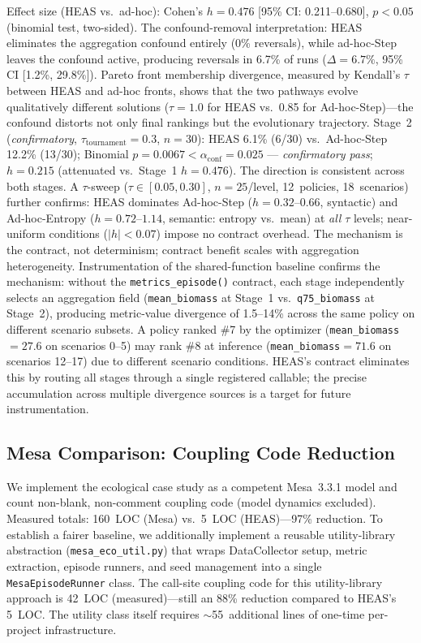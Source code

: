 \documentclass{wscpaperproc}
\begin{document}
Effect size (HEAS vs.\ ad-hoc): Cohen's $h = 0.476$ [95\% CI: 0.211--0.680],
$p < 0.05$ (binomial test, two-sided).
The confound-removal interpretation: HEAS eliminates the aggregation confound
entirely (0\% reversals), while ad-hoc-Step leaves the confound active, producing
reversals in 6.7\% of runs ($\Delta = 6.7\%$, 95\% CI [1.2\%, 29.8\%]). Pareto
front membership divergence, measured by Kendall's $\tau$ between HEAS and
ad-hoc fronts, shows that the two pathways evolve qualitatively different
solutions ($\tau = 1.0$ for HEAS vs.\ 0.85 for Ad-hoc-Step)---the confound
distorts not only final rankings but the evolutionary trajectory. Stage~2
(\emph{confirmatory}, $\tau_\text{tournament}\!=\!0.3$,
$n\!=\!30$): HEAS 6.1\% (6/30) vs.\ Ad-hoc-Step 12.2\% (13/30); Binomial
$p\!=\!0.0067 < \alpha_{\text{conf}}\!=\!0.025$ --- \emph{confirmatory pass};
$h\!=\!0.215$ (attenuated vs.\ Stage~1 $h\!=\!0.476$). The direction is consistent
across both stages. A $\tau$-sweep ($\tau \in [0.05,
0.30]$, $n\!=\!25$/level, 12~policies, 18~scenarios) further confirms: HEAS dominates
Ad-hoc-Step ($h\!=\!0.32$--$0.66$, syntactic) and Ad-hoc-Entropy ($h\!=\!0.72$--$1.14$,
semantic: entropy vs.\ mean) at \emph{all} $\tau$ levels; near-uniform conditions
($|h|\!<\!0.07$) impose no contract overhead. The mechanism is the contract, not
determinism; contract benefit scales with aggregation heterogeneity.
Instrumentation of the shared-function baseline confirms the mechanism:
without the \texttt{metrics\_episode()} contract, each stage independently
selects an aggregation field (\texttt{mean\_biomass} at Stage~1 vs.\
\texttt{q75\_biomass} at Stage~2), producing metric-value divergence of
1.5--14\% across the same policy on different scenario subsets. A policy
ranked \#7 by the optimizer (\texttt{mean\_biomass}$\!=\!27.6$ on
scenarios 0--5) may rank \#8 at inference (\texttt{mean\_biomass}$\!=\!71.6$
on scenarios 12--17) due to different scenario conditions. HEAS's
contract eliminates this by routing all stages through a single registered
callable; the precise accumulation across multiple divergence sources is
a target for future instrumentation.

\subsection{Mesa Comparison: Coupling Code Reduction}
\label{sec:mesa-comparison}

We implement the ecological case study as a competent Mesa~3.3.1 model and
count non-blank, non-comment coupling code (model dynamics excluded).
Measured totals: 160~LOC (Mesa) vs.\ 5~LOC (HEAS)---97\% reduction.
To establish a fairer baseline, we additionally implement a reusable
utility-library abstraction (\texttt{mesa\_eco\_util.py}) that wraps
DataCollector setup, metric extraction, episode runners, and seed management
into a single \texttt{MesaEpisodeRunner} class. The call-site coupling code
for this utility-library approach is 42~LOC (measured)---still an 88\%
reduction compared to HEAS's 5~LOC. The utility class itself requires
$\sim$55~additional lines of one-time per-project infrastructure.
\end{document}
